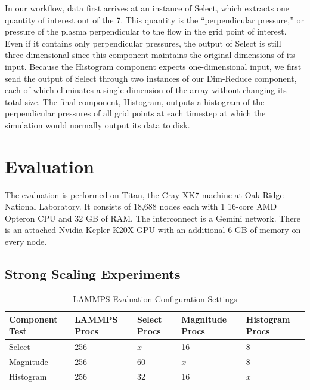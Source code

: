 \documentclass[conference]{IEEEtran}
\begin{document}
In our workflow, data first arrives at an instance of Select, which extracts
one quantity of interest out of the 7. This quantity is the ``perpendicular
pressure,'' or pressure of the plasma perpendicular to the flow in the grid
point of interest. Even if it contains only perpendicular pressures, the output
of Select is still three-dimensional since this component maintains the
original dimensions of its input. Because the Histogram component expects
one-dimensional input, we first send the output of Select through two instances
of our Dim-Reduce component, each of which eliminates a single dimension of the
array without changing its total size. The final component, Histogram, outputs
a histogram of the perpendicular pressures of all grid points at each timestep
at which the simulation would normally output its data to disk.

\section{Evaluation}
\label{s:eval}

The evaluation is performed on Titan, the Cray XK7 machine at Oak Ridge
National Laboratory. It consists of 18,688 nodes each with 1 16-core AMD
Opteron CPU and 32 GB of RAM. The interconnect is a Gemini network. There is an
attached Nvidia Kepler K20X GPU with an additional 6 GB of memory on every
node.


\subsection{Strong Scaling Experiments}

\begin{table}[tbp]
\centering
\caption{LAMMPS Evaluation Configuration Settings}
\label{tab:eval-strong-lammps}
\begin{tabular}{|l|l|l|l|l|}
\hline
Component Test & LAMMPS Procs & Select Procs & Magnitude Procs & Histogram Procs \\
\hline
Select & 256 & $x$ & 16 & 8\\
\hline
Magnitude & 256 & 60 & $x$ & 8\\
\hline
Histogram & 256 & 32 & 16 & $x$\\
\hline
\end{tabular}
\end{table}
\end{document}
